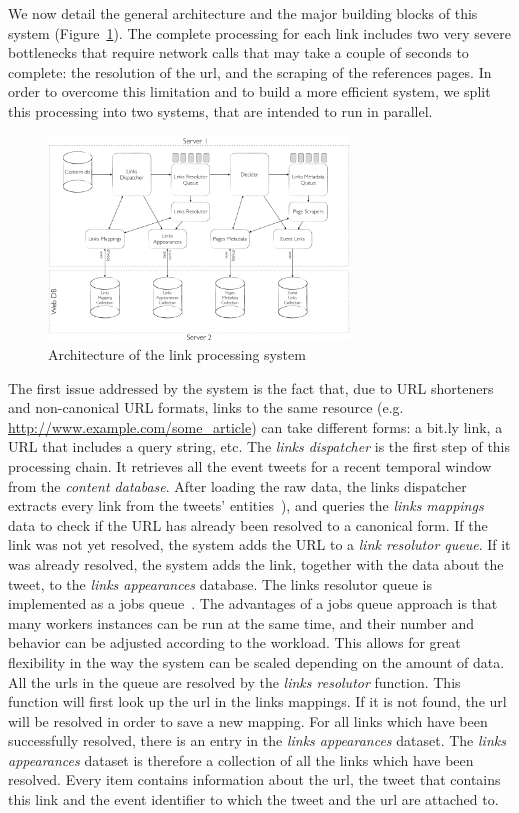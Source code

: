 \documentclass{sig-alternate}
\begin{document}
We now detail the general architecture and the major building blocks of this system (Figure~\ref{fig:architecture}). The complete processing for each link includes two very severe bottlenecks that require network calls that may take a couple of seconds to complete: the resolution of the url, and the scraping of the references pages. In order to overcome this limitation and to build a more efficient system, we split this processing into two systems, that are intended to run in parallel.

\begin{figure}[htbp]
  \centering
  \includegraphics[width=8cm]{Figures/links_processing_architecture.png}
  \caption{Architecture of the link processing system}
  \label{fig:architecture}
\end{figure}

The first issue addressed by the system is the fact that, due to URL shorteners and non-canonical URL formats, links to the same resource (e.g. \url{http://www.example.com/some\_article}) can take different forms: a bit.ly link, a URL that includes a query string, etc. The \emph{links dispatcher} is the first step of this processing chain. It retrieves all the event tweets for a recent temporal window from the \emph{content database}. After loading the raw data, the links dispatcher extracts every link from the tweets' entities~\cite{RestTweetsDoc}), and queries the \emph{links mappings} data to check if the URL has already been resolved to a canonical form. If the link was not yet resolved, the system adds the URL to a \emph{link resolutor queue}. If it was already resolved, the system adds the link, together with the data about the tweet, to the \emph{links appearances} database. The links resolutor queue is implemented as a jobs queue~\cite{RedisQueues}. The advantages of a jobs queue approach is that many workers instances can be run at the same time, and their number and behavior can be adjusted according to the workload. This allows for great flexibility in the way the system can be scaled depending on the amount of data. All the urls in the queue are resolved by the \emph{links resolutor} function. This function will first look up the url in the links mappings. If it is not found, the url will be resolved in order to save a new mapping. For all links which have been successfully resolved, there is an entry in the \emph{links appearances} dataset. The \emph{links appearances} dataset is therefore a collection of all the links which have been resolved. Every item contains information about the url, the tweet that contains this link and the event identifier to which the tweet and the url are attached to.
\end{document}
